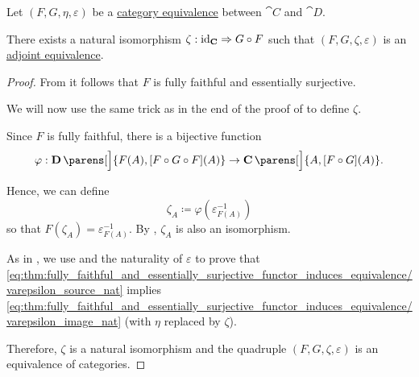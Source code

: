 \begin{proposition}\label{thm:adjoint_equivalence}
  Let \( (F, G, \eta, \varepsilon) \) be a \hyperref[def:category_equivalence]{category equivalence} between \( \cat{C} \) and \( \cat{D} \).

  There exists a natural isomorphism \( \zeta: \id_{\cat{C}} \Rightarrow G \bincirc F \) such that \( (F, G, \zeta, \varepsilon) \) is an \hyperref[def:adjoint_equivalence]{adjoint equivalence}.
\end{proposition}
\begin{proof}
  From  it follows that \( F \) is fully faithful and essentially surjective.

  We will now use the same trick as in the end of the proof of  to define \( \zeta \).

  Since \( F \) is fully faithful, there is a bijective function
  \begin{equation*}
    \varphi: \cat{D}\parens[\Big]{ F(A), [F \bincirc G \bincirc F](A) } \to \cat{C}\parens[\Big]{ A, [F \bincirc G](A) }.
  \end{equation*}

  Hence, we can define
  \begin{equation*}
    \zeta_A \coloneqq \varphi(\varepsilon_{F(A)}^{-1})
  \end{equation*}
  so that \( F(\zeta_A) = \varepsilon_{F(A)}^{-1} \). By , \( \zeta_A \) is also an isomorphism.

  As in , we use  and the naturality of \( \varepsilon \) to prove that \eqref{eq:thm:fully_faithful_and_essentially_surjective_functor_induces_equivalence/varepsilon_source_nat} implies \eqref{eq:thm:fully_faithful_and_essentially_surjective_functor_induces_equivalence/varepsilon_image_nat} (with \( \eta \) replaced by \( \zeta \)).

  Therefore, \( \zeta \) is a natural isomorphism and the quadruple \( (F, G, \zeta, \varepsilon) \) is an equivalence of categories.
\end{proof}
